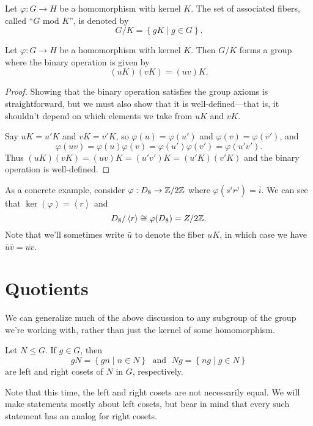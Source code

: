 \documentclass[../m171main.tex]{subfiles}
\begin{document}
\begin{definition}[]
    Let $\varphi : G \to H$ be a homomorphism with kernel $K$.
    The set of associated fibers, called ``$G$ mod $K$'', is denoted by
    \[ G / K = \left\{ gK \;|\; g \in G \right\}. \]
\end{definition}

\begin{theorem}[]
    Let $\varphi : G \to H$ be a homomorphism with kernel $K$.
    Then $G / K$ forms a group where the binary operation is given by
    \[ (uK)(vK) = (uv)K. \]
\end{theorem}

\begin{proof}
    Showing that the binary operation satisfies the group axioms is straightforward, but we must also show that it is well-defined---that is, it shouldn't depend on which elements we take from $uK$ and $vK$.

    Say $uK = u'K$ and $vK = v'K$, so $\varphi(u) = \varphi(u')$ and $\varphi(v) = \varphi(v')$, and
    \[ \varphi(uv) = \varphi(u) \varphi(v) = \varphi(u') \varphi(v') = \varphi(u'v'). \]
    Thus $(uK)(vK) = (uv)K = (u'v')K = (u'K)(v'K)$ and the binary operation is well-defined.
\end{proof}

As a concrete example, consider $\varphi : D_8 \to \mathbb{Z} / 2\mathbb{Z}$ where $\varphi(s^{i} r^{j}) = \bar i$.
We can see that $\ker(\varphi) = \left< r \right>$ and
\[ D_8 / \left< r \right> \cong \varphi(D_8) = Z / 2\mathbb{Z}. \]
Note that we'll sometimes write $\bar u$ to denote the fiber $uK$, in which case we have $\bar u \bar v = \overline{uv}$.

\section{Quotients}
We can generalize much of the above discussion to any subgroup of the group we're working with, rather than just the kernel of some homomorphism.

\begin{definition}[Coset]
    Let $N \leq G$.
    If $g \in G$, then
    \[ gN = \left\{ gn \;|\; n \in N \right\} \;\text{ and }\; Ng = \left\{ ng \;|\; g \in N \right\} \]
    are left and right cosets of $N$ in $G$, respectively.
\end{definition}

Note that this time, the left and right cosets are not necessarily equal.
We will make statements mostly about left cosets, but bear in mind that every such statement has an analog for right cosets.
\end{document}
